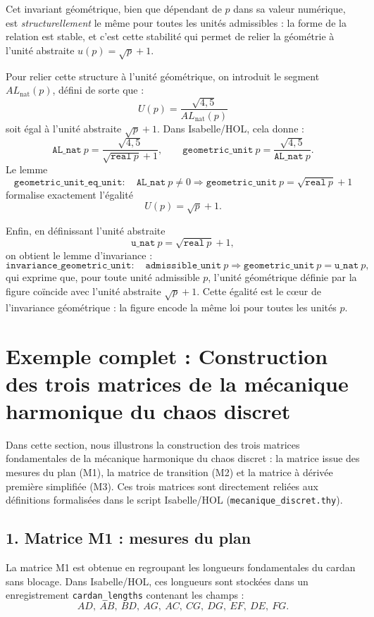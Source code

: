 \documentclass[12pt,a4paper]{article}
\begin{document}
Cet invariant géométrique, bien que dépendant de $p$ dans sa valeur numérique,
est \emph{structurellement} le même pour toutes les unités admissibles : la
forme de la relation est stable, et c'est cette stabilité qui permet de
relier la géométrie à l'unité abstraite $u(p) = \sqrt{p} + 1$.

Pour relier cette structure à l'unité géométrique, on introduit le segment
$AL_{\text{nat}}(p)$, défini de sorte que :
\[
  U(p) = \frac{\sqrt{4{,}5}}{AL_{\text{nat}}(p)}
\]
soit égal à l'unité abstraite $\sqrt{p} + 1$. Dans Isabelle/HOL, cela donne :
\[
  \texttt{AL\_nat}\ p = \frac{\sqrt{4{,}5}}{\sqrt{\texttt{real}\ p} + 1},
  \qquad
  \texttt{geometric\_unit}\ p = \frac{\sqrt{4{,}5}}{\texttt{AL\_nat}\ p}.
\]
Le lemme
\[
  \texttt{geometric\_unit\_eq\_unit} :
  \quad \texttt{AL\_nat}\ p \neq 0
  \Longrightarrow
  \texttt{geometric\_unit}\ p = \sqrt{\texttt{real}\ p} + 1
\]
formalise exactement l'égalité
\[
  U(p) = \sqrt{p} + 1.
\]

Enfin, en définissant l'unité abstraite
\[
  \texttt{u\_nat}\ p = \sqrt{\texttt{real}\ p} + 1,
\]
on obtient le lemme d'invariance :
\[
  \texttt{invariance\_geometric\_unit} :
  \quad \texttt{admissible\_unit}\ p
  \Longrightarrow
  \texttt{geometric\_unit}\ p = \texttt{u\_nat}\ p,
\]
qui exprime que, pour toute unité admissible $p$, l'unité géométrique
définie par la figure coïncide avec l'unité abstraite $\sqrt{p} + 1$.
Cette égalité est le cœur de l'invariance géométrique : la figure encode
la même loi pour toutes les unités $p$.

\section{Exemple complet : Construction des trois matrices de la mécanique harmonique du chaos discret}

Dans cette section, nous illustrons la construction des trois matrices fondamentales
de la mécanique harmonique du chaos discret : la matrice issue des mesures du plan
(M1), la matrice de transition (M2) et la matrice à dérivée première simplifiée (M3).
Ces trois matrices sont directement reliées aux définitions formalisées dans le
script Isabelle/HOL (\texttt{mecanique\_discret.thy}).

\subsection{1. Matrice M1 : mesures du plan}

La matrice M1 est obtenue en regroupant les longueurs fondamentales du cardan
sans blocage. Dans Isabelle/HOL, ces longueurs sont stockées dans un enregistrement
\texttt{cardan\_lengths} contenant les champs :
\[
  AD,\ AB,\ BD,\ AG,\ AC,\ CG,\ DG,\ EF,\ DE,\ FG.
\]
\end{document}
